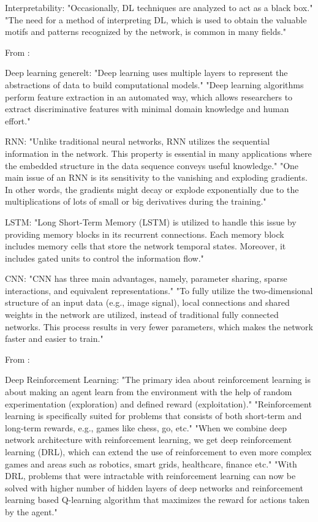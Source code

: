 Interpretability:
"Occasionally, DL techniques are analyzed to act as a black box."
"The need for a method of interpreting DL, which is used to obtain the valuable motifs and patterns recognized by the network, is common in many fields."

From \parencite{pouyanfar2018survey_deep_learning_algorithms}:

Deep learning generelt:
"Deep learning uses multiple layers to represent the abstractions of data to build computational models."
"Deep learning algorithms perform feature extraction in an automated way, which allows researchers to extract discriminative features with minimal domain knowledge and human effort."

RNN:
"Unlike traditional neural networks, RNN utilizes the sequential information in the network. This property is essential in many applications where the embedded structure in the data sequence conveys useful knowledge."
"One main issue of an RNN is its sensitivity to the vanishing and exploding gradients. In other words, the gradients might decay or explode exponentially due to the multiplications of lots of small or big derivatives during the training."

LSTM:
"Long Short-Term Memory (LSTM) is utilized to handle this issue by providing memory blocks in its recurrent connections. Each memory block includes memory cells that store the network temporal states. Moreover, it includes gated units to control the information flow."

CNN:
"CNN has three main advantages, namely, parameter sharing, sparse interactions, and equivalent representations."
"To fully utilize the two-dimensional structure of an input data (e.g., image signal), local connections and shared weights in the network are utilized, instead of traditional fully connected networks. This process results in very fewer parameters, which makes the network faster and easier to train."

From \parencite{shrestha2019review_deep_learning_algorithms_architectures}:

Deep Reinforcement Learning:
"The primary idea about reinforcement learning is about making an agent learn from the environment with the help of random experimentation (exploration) and defined reward (exploitation)."
"Reinforcement learning is specifically suited for problems that consists of both short-term and long-term rewards, e.g., games like chess, go, etc."
"When we combine deep network architecture with reinforcement learning, we get deep reinforcement learning (DRL), which can extend the use of reinforcement to even more complex games and areas such as robotics, smart grids, healthcare, finance etc."
"With DRL, problems that were intractable with reinforcement learning can now be solved with higher number of hidden layers of deep networks and reinforcement learning based Q-learning algorithm that maximizes the reward for actions taken by the agent."

